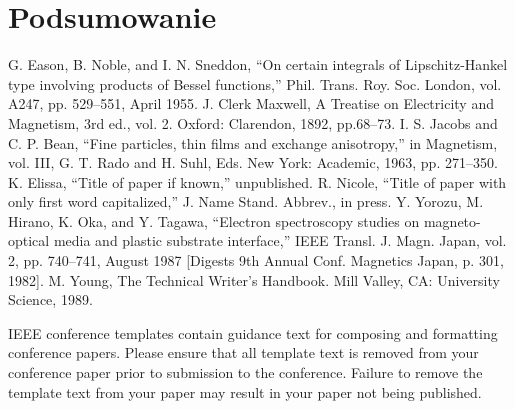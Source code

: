 \documentclass[conference]{IEEEtran}
\begin{document}
\section{Podsumowanie}

\begin{thebibliography}{00}
     G. Eason, B. Noble, and I. N. Sneddon, ``On certain integrals of Lipschitz-Hankel type involving products of Bessel functions,'' Phil. Trans. Roy. Soc. London, vol. A247, pp. 529--551, April 1955.
     J. Clerk Maxwell, A Treatise on Electricity and Magnetism, 3rd ed., vol. 2. Oxford: Clarendon, 1892, pp.68--73.
     I. S. Jacobs and C. P. Bean, ``Fine particles, thin films and exchange anisotropy,'' in Magnetism, vol. III, G. T. Rado and H. Suhl, Eds. New York: Academic, 1963, pp. 271--350.
     K. Elissa, ``Title of paper if known,'' unpublished.
     R. Nicole, ``Title of paper with only first word capitalized,'' J. Name Stand. Abbrev., in press.
     Y. Yorozu, M. Hirano, K. Oka, and Y. Tagawa, ``Electron spectroscopy studies on magneto-optical media and plastic substrate interface,'' IEEE Transl. J. Magn. Japan, vol. 2, pp. 740--741, August 1987 [Digests 9th Annual Conf. Magnetics Japan, p. 301, 1982].
     M. Young, The Technical Writer's Handbook. Mill Valley, CA: University Science, 1989.
\end{thebibliography}
\vspace{12pt}
\color{red}
IEEE conference templates contain guidance text for composing and formatting conference papers. Please ensure that all template text is removed from your conference paper prior to submission to the conference. Failure to remove the template text from your paper may result in your paper not being published.
\end{document}
